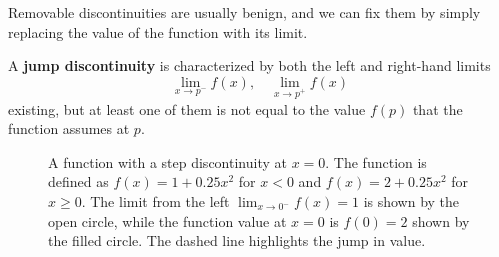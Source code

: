   Removable discontinuities are usually benign, and we can fix them by simply replacing the value of the function with its limit. 

  \begin{definition}
    \label{def:jump-discontinuity}
    A \textbf{jump discontinuity} is characterized by both the left and right-hand limits 
    \begin{equation}
      \lim_{x \to p^-} f(x), \quad \lim_{x \to p^+} f(x)
    \end{equation}
    existing, but at least one of them is not equal to the value $f(p)$ that the function assumes at $p$. 

    \begin{figure}[H]
      \centering 
      \caption{A function with a step discontinuity at $x=0$. The function is defined as $f(x) = 1 + 0.25x^2$ for $x < 0$ and $f(x) = 2 + 0.25x^2$ for $x \geq 0$. The limit from the left $\lim_{x \to 0^-} f(x) = 1$ is shown by the open circle, while the function value at $x=0$ is $f(0) = 2$ shown by the filled circle. The dashed line highlights the jump in value.}
      \label{fig:step-discontinuity}
    \end{figure}
  \end{definition}

